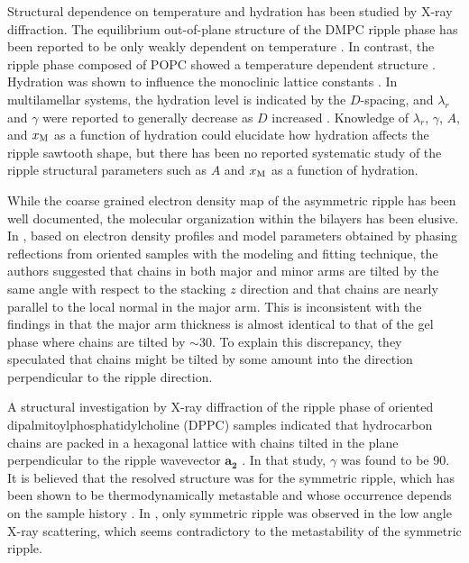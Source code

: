 Structural dependence on temperature and hydration has been studied by X-ray diffraction.
The equilibrium out-of-plane structure of the DMPC ripple phase has been 
reported to be only weakly dependent on temperature \cite{ref:Sengupta03}. 
In contrast, the ripple phase composed of 
\acs{POPC} showed a temperature dependent structure \cite{ref:Sengupta03}.
Hydration was shown to influence the monoclinic 
lattice constants \cite{ref:Wack89}. In multilamellar systems, the hydration
level is indicated by the $D$-spacing, and 
$\lambda_r$ and $\gamma$ were reported to generally decrease as $D$ increased
\cite{ref:Wack89}.
Knowledge of $\lambda_r$, $\gamma$, $A$, and $x_\textrm{M}$ as a function of hydration 
could elucidate how hydration affects the ripple sawtooth shape, but
there has been no reported systematic study of the ripple structural parameters 
such as $A$ and $x_\textrm{M}$ as a function of hydration.  


While the coarse grained electron density map of the asymmetric ripple has been well documented,
the molecular organization within the bilayers has been elusive.
In \cite{ref:Sengupta00,ref:Sengupta03}, based on electron density profiles 
and model parameters obtained by phasing reflections from oriented samples
with the modeling and fitting technique, 
the authors suggested that chains in both major and minor arms are tilted
by the same angle with respect to the stacking $z$ direction and that 
chains are nearly parallel to the local normal in the major arm. 
This is inconsistent with the findings in \cite{ref:Sun96} that
the major arm thickness is almost identical to that of the gel phase where chains 
are tilted by $\sim$30\textdegree. To explain this discrepancy, 
they speculated that chains might be tilted by some amount into the 
direction perpendicular to the ripple direction. 


A structural investigation by X-ray diffraction of the ripple phase of
oriented dipalmitoylphosphatidylcholine (\acs{DPPC}) samples indicated that
hydrocarbon chains are packed in a hexagonal lattice with chains
tilted in the plane perpendicular to the ripple wavevector $\mathbf{a_2}$ \cite{ref:Hentschel91}.
In that study, $\gamma$ was found to be 90\textdegree.
It is believed that the resolved structure was for the symmetric ripple,
which has been shown to be thermodynamically metastable and whose occurrence
depends on the sample history \cite{ref:Katsaras00}. 
In \cite{ref:Hentschel91}, only symmetric ripple was observed in the low angle
X-ray scattering, which seems contradictory to the metastability of the
symmetric ripple.

